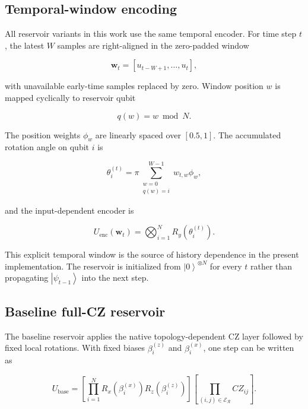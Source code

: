 \documentclass[final,1p,times]{elsarticle}
\newcommand{\ket}[1]{\left|#1\right\rangle}
\begin{document}
\subsection{Temporal-window encoding}

All reservoir variants in this work use the same temporal encoder. For
time step $t$, the latest $W$ samples are right-aligned in the
zero-padded window

\begin{equation}
\bm w_t =
[u_{t-W+1},\ldots,u_t],
\label{eq:shared_window}
\end{equation}

with unavailable early-time samples replaced by zero. Window position
$w$ is mapped cyclically to reservoir qubit

\begin{equation}
q(w)=w\bmod N.
\label{eq:shared_slot}
\end{equation}

The position weights $\phi_w$ are linearly spaced over $[0.5,1]$. The
accumulated rotation angle on qubit $i$ is

\begin{equation}
\theta_i^{(t)}
=
\pi
\sum_{\substack{w=0\\q(w)=i}}^{W-1}
w_{t,w}\phi_w ,
\label{eq:shared_theta}
\end{equation}

and the input-dependent encoder is

\begin{equation}
U_{\mathrm{enc}}(\bm w_t)
=
\bigotimes_{i=1}^{N}
R_y\!\left(\theta_i^{(t)}\right).
\label{eq:shared_encoder}
\end{equation}

This explicit temporal window is the source of history dependence in
the present implementation. The reservoir is initialized from
$\ket{0}^{\otimes N}$ for every $t$ rather than propagating
$\ket{\psi_{t-1}}$ into the next step.

\subsection{Baseline full-CZ reservoir}

The baseline reservoir applies the native topology-dependent CZ layer
followed by fixed local rotations. With fixed biases
$\beta_i^{(z)}$ and $\beta_i^{(x)}$, one step can be written as

\begin{equation}
U_{\mathrm{base}}
=
\left[
\prod_{i=1}^{N}
R_x(\beta_i^{(x)})
R_z(\beta_i^{(z)})
\right]
\left[
\prod_{(i,j)\in\mathcal E_{\mathcal R}}
CZ_{ij}
\right].
\label{eq:baseline_unitary}
\end{equation}
\end{document}

